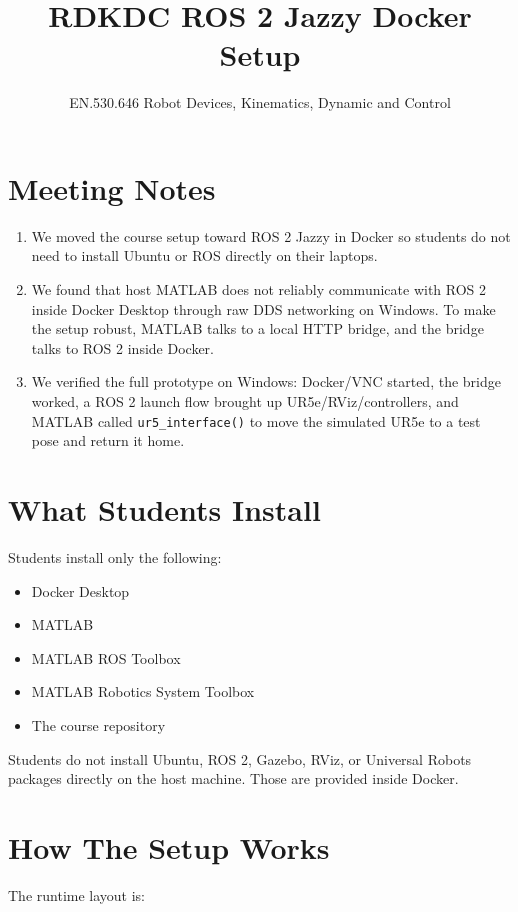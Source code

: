 \documentclass[11pt]{article}
\title{RDKDC ROS 2 Jazzy Docker Setup}
\author{EN.530.646 Robot Devices, Kinematics, Dynamic and Control}
\date{}
\begin{document}
\maketitle

\section*{Meeting Notes}

\begin{enumerate}
    \item We moved the course setup toward ROS 2 Jazzy in Docker so students do not need to install Ubuntu or ROS directly on their laptops.
    \item We found that host MATLAB does not reliably communicate with ROS 2 inside Docker Desktop through raw DDS networking on Windows. To make the setup robust, MATLAB talks to a local HTTP bridge, and the bridge talks to ROS 2 inside Docker.
    \item We verified the full prototype on Windows: Docker/VNC started, the bridge worked, a ROS 2 launch flow brought up UR5e/RViz/controllers, and MATLAB called \texttt{ur5\_interface()} to move the simulated UR5e to a test pose and return it home.
\end{enumerate}

\section*{What Students Install}

Students install only the following:

\begin{itemize}
    \item Docker Desktop
    \item MATLAB
    \item MATLAB ROS Toolbox
    \item MATLAB Robotics System Toolbox
    \item The course repository
\end{itemize}

Students do not install Ubuntu, ROS 2, Gazebo, RViz, or Universal Robots packages directly on the host machine. Those are provided inside Docker.

\section*{How The Setup Works}

The runtime layout is:
\end{document}
